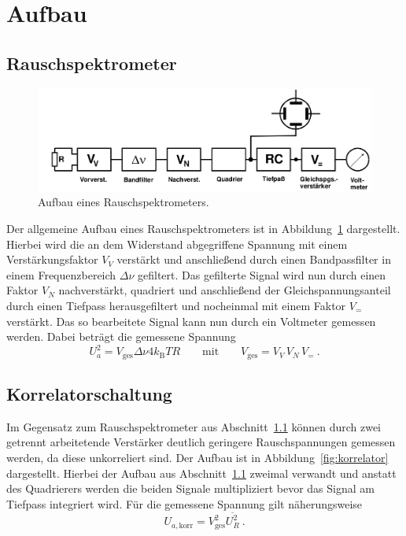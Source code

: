 

\section{Aufbau}

\subsection{Rauschspektrometer}
\label{sub:rauschspektrometer}

\begin{figure}[!htpb]
  \centering
  \includegraphics[scale=0.3]{bilder/spektrometer}
  \caption{Aufbau eines Rauschspektrometers.\cite{FP}}
\label{fig:spektrometer}
\end{figure}

Der allgemeine Aufbau eines Rauschspektrometers ist in
Abbildung~\ref{fig:spektrometer} dargestellt.
Hierbei wird die an dem Widerstand abgegriffene Spannung mit einem
Verstärkungsfaktor $V_V$ verstärkt und anschließend durch einen Bandpassfilter
in einem Frequenzbereich $\Delta \nu$ gefiltert.
Das gefilterte Signal wird nun durch einen Faktor $V_N$ nachverstärkt,
quadriert und anschließend der Gleichspannungsanteil durch einen Tiefpass
herausgefiltert und nocheinmal mit einem Faktor $V_=$ verstärkt.
Das so bearbeitete Signal kann nun durch ein Voltmeter gemessen werden.
Dabei beträgt die gemessene Spannung
\begin{equation}
  U_a^2 = V_\text{ges} \Delta\nu 4 k_\text{B}TR \qquad \text{mit}\qquad
  V_\text{ges} = V_V\,V_N\,V_=~.
\end{equation}

\subsection{Korrelatorschaltung}
\label{sub:korrelatorschaltung}

Im Gegensatz zum Rauschspektrometer aus Abschnitt~\ref{sub:rauschspektrometer}
können durch zwei getrennt arbeitetende Verstärker deutlich geringere
Rauschspannungen gemessen werden, da diese unkorreliert sind.
Der Aufbau ist in Abbildung~\ref{fig:korrelator} dargestellt.
Hierbei der Aufbau aus Abschnitt~\ref{sub:rauschspektrometer} zweimal verwandt
und anstatt des Quadrierers werden die beiden Signale multipliziert bevor das
Signal am Tiefpass integriert wird.
Für die gemessene Spannung gilt näherungsweise
\begin{equation}
  U_{a,\text{korr}} = V_\text{ges}^2 \overline{U_R^2}~.
\end{equation}

